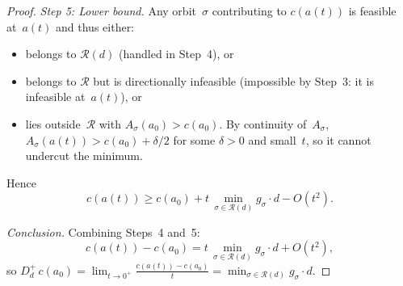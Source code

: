 \begin{unverified}
\begin{proof}
\emph{Step 5: Lower bound.}
Any orbit~$\sigma$ contributing to $c(a(t))$ is feasible
at~$a(t)$ and thus either:
\begin{itemize}
\item
  belongs to $\mathcal{R}(d)$ (handled in Step~4), or
\item
  belongs to $\mathcal{R}$ but is directionally infeasible
  (impossible by Step~3: it is infeasible at~$a(t)$), or
\item
  lies outside~$\mathcal{R}$ with $A_\sigma(a_0) > c(a_0)$.
  By continuity of~$A_\sigma$,
  $A_\sigma(a(t)) > c(a_0) + \delta/2$ for some $\delta > 0$
  and small~$t$, so it cannot undercut the minimum.
\end{itemize}
Hence
\[
  c(a(t)) \geq c(a_0)
  + t\,\min_{\sigma \in \mathcal{R}(d)} g_\sigma \cdot d
  - O(t^2).
\]

\emph{Conclusion.}
Combining Steps~4 and~5:
\[
  c(a(t)) - c(a_0)
  = t\,\min_{\sigma \in \mathcal{R}(d)} g_\sigma \cdot d + O(t^2),
\]
so $D_d^+\, c(a_0)
= \lim_{t \to 0^+} \frac{c(a(t)) - c(a_0)}{t}
= \min_{\sigma \in \mathcal{R}(d)} g_\sigma \cdot d$.
\end{proof}
\end{unverified}


